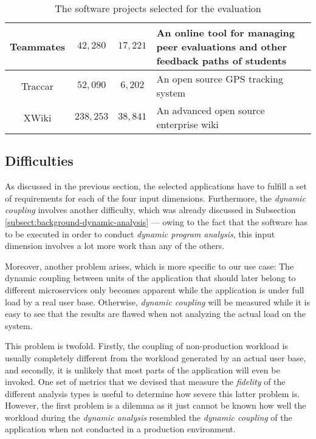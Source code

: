\documentclass[12pt,a4paper]{report}
\begin{document}
\begin{table}[ht!]
\begin{tabularx}{\textwidth}{|c|c|c|X|}
Teammates           & $42,280$  & $17,221$  &
An online tool for managing peer evaluations and other feedback paths of students \\\hline

Traccar             & $52,090$  & $6,202$   &
An open source GPS tracking system \\\hline

XWiki               & $238,253$ & $38,841$  &
An advanced open source enterprise wiki \\\hline

\end{tabularx}
\caption{The software projects selected for the evaluation}
\label{table:evaluation-projects}
\end{table}


\subsection{Difficulties} \label{subsect:difficulties}

As discussed in the previous section, the selected applications have to fulfill
a set of requirements for each of the four input dimensions. Furthermore, the
\textit{dynamic coupling} involves another difficulty, which was already
discussed in Subsection \ref{subsect:background-dynamic-analysis} --- owing to
the fact that the software has to be executed in order to conduct
\textit{dynamic program analysis}, this input dimension involves a lot more work
than any of the others.

Moreover, another problem arises, which is more specific to our use case: The
dynamic coupling between units of the application that should later belong to
different microservices only becomes apparent while the application is under
full load by a real user base. Otherwise, \textit{dynamic coupling} will be
measured while it is easy to see that the results are flawed when not analyzing
the actual load on the system.

This problem is twofold. Firstly, the coupling of non-production workload is
usually completely different from the workload generated by an actual user
base, and secondly, it is unlikely that most parts of the application will even
be invoked. One set of metrics that we devised that measure the \textit{fidelity}
of the different analysis types is useful to determine how severe
this latter problem is. However, the first problem is a dilemma as it just
cannot be known how well the workload during the \textit{dynamic analysis}
resembled the \textit{dynamic coupling} of the application when not conducted
in a production environment.
\end{document}
